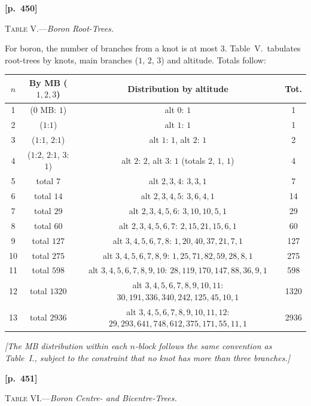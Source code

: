 \documentclass[11pt,a4paper]{article}
\begin{document}
\newpage
\noindent\textbf{[p.~450]}\quad
\begin{center}
\textsc{Table V.}\quad---\quad\textit{Boron Root-Trees.}
\end{center}

\noindent For boron, the number of branches from a knot is at most $3$. Table~V.\ tabulates root-trees by knots, main branches ($1,\,2,\,3$) and altitude. Totals follow:

\medskip

\begin{center}
\begin{tabular}{c|cc|c}
$n$ & By MB ($1,2,3$) & Distribution by altitude & Tot.\\\hline
1 & ($0$ MB: $1$) & alt $0$: $1$ & 1\\
2 & ($1$:$1$) & alt $1$: $1$ & 1\\
3 & ($1$:$1$, $2$:$1$) & alt $1$: $1$, alt $2$: $1$ & 2\\
4 & ($1$:$2$, $2$:$1$, $3$:$1$) & alt $2$: $2$, alt $3$: $1$ \quad (totals $2,\,1,\,1$) & 4\\
5 & total $7$ & alt $2,3,4$: $3,3,1$ & 7\\
6 & total $14$ & alt $2,3,4,5$: $3,6,4,1$ & 14\\
7 & total $29$ & alt $2,3,4,5,6$: $3,10,10,5,1$ & 29\\
8 & total $60$ & alt $2,3,4,5,6,7$: $2,15,21,15,6,1$ & 60\\
9 & total $127$ & alt $3,4,5,6,7,8$: $1,20,40,37,21,7,1$ & 127\\
10 & total $275$ & alt $3,4,5,6,7,8,9$: $1,25,71,82,59,28,8,1$ & 275\\
11 & total $598$ & alt $3,4,5,6,7,8,9,10$: $28,119,170,147,88,36,9,1$ & 598\\
12 & total $1320$ & alt $3,4,5,6,7,8,9,10,11$: $30,191,336,340,242,125,45,10,1$ & 1320\\
13 & total $2936$ & alt $3,4,5,6,7,8,9,10,11,12$: $29,293,641,748,612,375,171,55,11,1$ & 2936
\end{tabular}
\end{center}

\noindent\textit{[The MB distribution within each $n$-block follows the same convention as Table~I., subject to the constraint that no knot has more than three branches.]}

\newpage
\noindent\textbf{[p.~451]}\quad
\begin{center}
\textsc{Table VI.}\quad---\quad\textit{Boron Centre- and Bicentre-Trees.}
\end{center}
\end{document}
